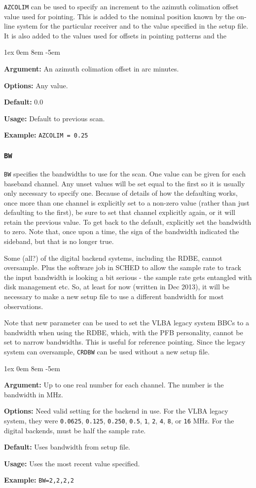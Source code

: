 \documentclass{report}
\newcommand{\rcwbox}[5]{
  \begin{list}{}{\parsep 1ex  \itemsep 0em
                 \leftmargin 8em  \itemindent -5em }
    \item {\bf Argument:} #1
    \item {\bf Options:}  #2
    \item {\bf Default:}  #3
    \item {\bf Usage:}    #4
    \item {\bf Example:}  #5
  \end{list}
}
\begin{document}
{\tt AZCOLIM} can be used to specify an
increment to the azimuth colimation offset value used for pointing.
This is added to the nominal position known by the on-line system
for the particular receiver and to the value specified in the setup
file.  It is also added to the values used for offsets in pointing
patterns and the 

\rcwbox
{An azimuth colimation offset in arc minutes.}
{Any value.}
{0.0}
{Default to previous scan.}
{{\tt AZCOLIM = 0.25 }}



\subsubsection{\label{MP:BW}{\tt BW}}

{\tt BW} specifies the bandwidths to use for the scan.  One value can
be given for each baseband channel.  Any unset values will be set
equal to the first so it is usually only necessary to specify one.
Because of details of how the defaulting works, once more than one
channel is explicitly set to a non-zero value (rather than just
defaulting to the first), be sure to set that channel explicitly
again, or it will retain the previous value.  To get back to the 
default, explicitly set the bandwidth to zero.  Note that, once upon
a time, the sign of the bandwidth indicated the sideband, but that
is no longer true.

Some (all?) of the digital backend systems, including the RDBE, cannot
oversample.  Plus the software job in SCHED to allow the sample rate
to track the input bandwidth is looking a bit serious - the sample rate
gets entangled with disk management etc.  So, at least for now (written
in Dec 2013), it will be necessary to make a new setup file to use
a different bandwidth for most observations.

Note that new parameter  can be used to
set the VLBA legacy system BBCs to a bandwidth when using the RDBE,
which, with the PFB personality, cannot be set to narrow bandwidths.
This is useful for reference pointing.  Since the legacy system can
oversample, {\tt CRDBW} can be used without a new setup file.

\rcwbox
{Up to one real number for each channel.  The number is the bandwidth
in MHz.}
{Need valid setting for the backend in use.  For the VLBA legacy
system, they were {\tt 0.0625}, {\tt 0.125}, {\tt 0.250}, {\tt 0.5},
{\tt 1}, {\tt 2}, {\tt 4}, {\tt 8}, or {\tt 16} MHz. For the digital
backends, must be half the sample rate.}
{Uses bandwidth from setup file.}
{Uses the most recent value specified.}
{{\tt BW=2,2,2,2}}
\end{document}
